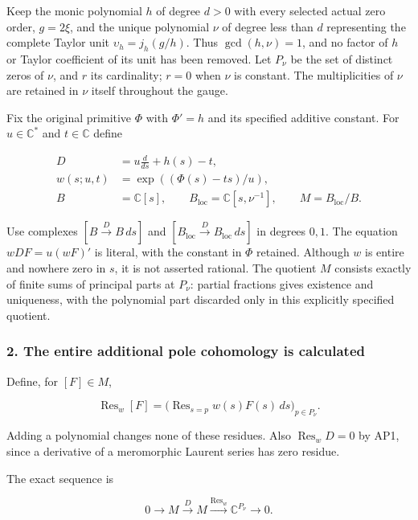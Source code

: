 Keep the monic polynomial \(h\) of degree \(d>0\) with every selected actual zero order, \(g=2\xi\), and the unique polynomial \(\nu\) of degree less than \(d\) representing the complete Taylor unit \(\upsilon_h=j_h(g/h)\). Thus \(\gcd(h,\nu)=1\), and no factor of \(h\) or Taylor coefficient of its unit has been removed. Let \(P_{\nu}\) be the set of distinct zeros of \(\nu\), and \(r\) its cardinality; \(r=0\) when \(\nu\) is constant. The multiplicities of \(\nu\) are retained in \(\nu\) itself throughout the gauge.

Fix the original primitive \(\Phi\) with \(\Phi'=h\) and its specified additive constant. For \(u\in\mathbb{C}^{*}\) and \(t\in\mathbb{C}\) define

\[
\begin{aligned}
D&=u\frac{d}{ds}+h(s)-t,\\
w(s;u,t)&=\exp((\Phi(s)-t s)/u),\\
B&=\mathbb C[s],\qquad B_{\mathrm{loc}}=\mathbb C[s,\nu^{-1}],
\qquad M=B_{\mathrm{loc}}/B.
\end{aligned}
\tag{AP1}
\]

Use complexes \([B\xrightarrow{D}B\,ds]\) and \([B_{\mathrm{loc}}\xrightarrow{D}B_{\mathrm{loc}}\,ds]\) in degrees \(0,1\). The equation \(w D F = u (w F)'\) is literal, with the constant in \(\Phi\) retained. Although \(w\) is entire and nowhere zero in \(s\), it is not asserted rational. The quotient \(M\) consists exactly of finite sums of principal parts at \(P_{\nu}\): partial fractions gives existence and uniqueness, with the polynomial part discarded only in this explicitly specified quotient.

\subsubsection{2. The entire additional pole cohomology is calculated}\label{endpoint-analytic_pole--the-entire-additional-pole-cohomology-is-calculated}

Define, for \([F]\in M\),

\[
\operatorname{Res}_w[F]
=\bigl(\operatorname{Res}_{s=p}w(s)F(s)\,ds\bigr)_{p\in P_\nu}.
\tag{AP2}
\]

Adding a polynomial changes none of these residues. Also \(\operatorname{Res}_w D=0\) by AP1, since a derivative of a meromorphic Laurent series has zero residue.

The exact sequence is

\[
0\longrightarrow M\xrightarrow{D}M
\xrightarrow{\operatorname{Res}_w}\mathbb C^{P_\nu}\longrightarrow0.
\tag{AP3}
\]

